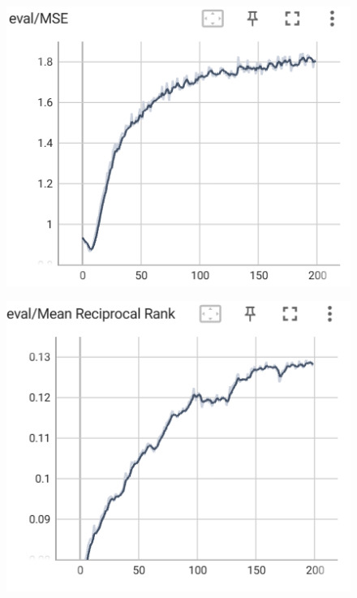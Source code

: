 \documentclass[12pt]{article}
\begin{document}
\begin{enumerate}
    \begin{figure}[htbp]
	\centering
	\begin{minipage}{0.4\linewidth}
		\centering
		\includegraphics[width=0.9\linewidth]{./figs/eval_mse_50_50.png}
		\label{pic one}%
	\end{minipage}
	\begin{minipage}{0.4\linewidth}
		\centering
		\includegraphics[width=0.9\linewidth]{./figs/eval_mrr_50_50.png}
		\label{pic two}%
	\end{minipage}
    \end{figure}

    
\end{enumerate}
\end{document}
